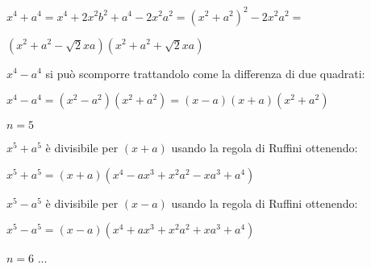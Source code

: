 \begin{itemize*}
\begin{itemize*}
   $x^4+a^4 = x^4+2x^2b^2+a^4-2x^2a^2 = (x^2+a^2)^2-2x^2a^2=$
   
   $\left(x^2+a^2-\sqrt{2}xa\right)\left(x^2+a^2+\sqrt{2}xa\right)$
   
  \item $x^4-a^4$ si può scomporre trattandolo come la differenza di due 
   quadrati:
   
   $x^4-a^4 = (x^2-a^2)(x^2+a^2) = (x-a)(x+a)(x^2+a^2) $
 \end{itemize*}

 \item $n=5$
 \begin{itemize*}
  \item $x^5+a^5$ è divisibile per $(x+a)$ usando la regola di Ruffini
   ottenendo: 
   
   $x^5+a^5=(x+a)(x^4-ax^3+x^2a^2-xa^3+a^4)$
   
  \item $x^5-a^5$ è divisibile per $(x-a)$ usando la regola di Ruffini
   ottenendo: 
   
   $x^5-a^5=(x-a)(x^4+ax^3+x^2a^2+xa^3+a^4)$
   
 \end{itemize*}

 \item $n=6$ ...
 
\end{itemize*}

%  
% 
% 
% 
%  
% 
% 
% 
% 
% 

